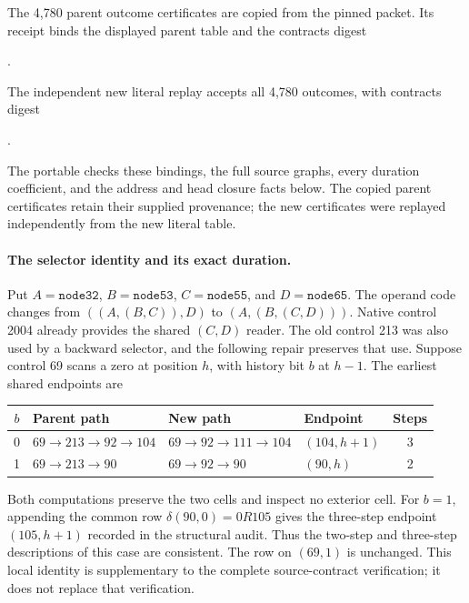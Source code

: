 The 4,780 parent outcome certificates are copied from the pinned
packet.  Its receipt binds the displayed parent table and the
contracts digest
\begin{center}\footnotesize
{}.
\end{center}
The independent new literal replay accepts all 4,780 outcomes, with
contracts digest
\begin{center}\footnotesize
{}.
\end{center}
The portable  checks these
bindings, the full source graphs, every duration coefficient, and the
address and head closure facts below.  The copied parent certificates
retain their supplied provenance; the new certificates were replayed
independently from the new literal table.

\paragraph{The selector identity and its exact duration.}
Put $A=\texttt{node32}$, $B=\texttt{node53}$,
$C=\texttt{node55}$, and $D=\texttt{node65}$.  The operand code changes
from $((A,(B,C)),D)$ to $(A,(B,(C,D)))$.  Native control 2004 already
provides the shared $(C,D)$ reader.  The old control 213 was also used
by a backward selector, and the following repair preserves that use.
Suppose control 69 scans a zero at position $h$, with history bit $b$
at $h-1$.  The earliest shared endpoints are
\begin{center}\small
\begin{tabular}{clllc}
\toprule
$b$ & Parent path & New path & Endpoint & Steps\\
\midrule
0 & $69\to213\to92\to104$ & $69\to92\to111\to104$
  & $(104,h+1)$ & 3\\
1 & $69\to213\to90$ & $69\to92\to90$
  & $(90,h)$ & 2\\
\bottomrule
\end{tabular}
\end{center}
Both computations preserve the two cells and inspect no exterior
cell.  For $b=1$, appending the common row $\delta(90,0)=0R105$ gives
the three-step endpoint $(105,h+1)$ recorded in the structural audit.
Thus the two-step and three-step descriptions of this case are
consistent.  The row on $(69,1)$ is unchanged.  This local identity
is supplementary to the complete source-contract verification; it
does not replace that verification.

